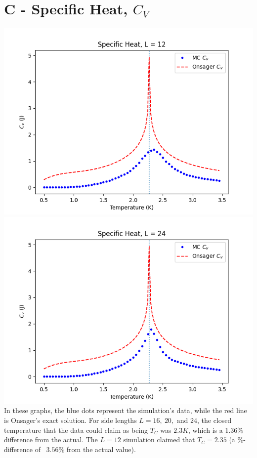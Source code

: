 \documentclass{article}
\begin{document}
    \section{C - Specific Heat, $ C_V $}
		\includegraphics[width=\textwidth]{C/C_12}
		\includegraphics[width=\textwidth]{C/C_24}
		In these graphs, the blue dots represent the simulation's data, while the red line is Onsager's exact solution. For side lengths $ L = 16,\ 20,\text{ and } 24 $, the closed temperature that the data could claim as being $ T_C $ was $ 2.3 K $, which is a $ 1.36 \% $ difference from the actual. The $ L = 12 $ simulation claimed that $ T_C = 2.35 $ (a \%-difference of ~$3.56 \%$ from the actual value).
		
\end{document}
